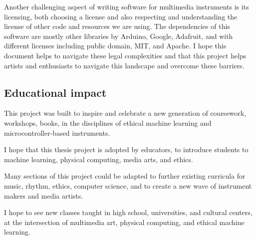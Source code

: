 Another challenging aspect of writing software for multimedia instruments is its licensing, both choosing a license and also respecting and understanding the license of other code and resources we are using. The dependencies of this software are mostly other libraries by Arduino, Google, Adafruit, and with different licenses including public domain, MIT, and Apache. I hope this document helps to navigate these legal complexities and that this project helps artists and enthusiasts to navigate this landscape and overcome these barriers.

\subsection{Educational impact}

This project was built to inspire and celebrate a new generation of coursework, workshops, books, in the disciplines of ethical machine learning and microcontroller-based instruments.

I hope that this thesis project is adopted by educators, to introduce students to machine learning, physical computing, media arts, and ethics.

Many sections of this project could be adapted to further existing curricula for music, rhythm, ethics, computer science, and to create a new wave of instrument makers and media artists.

I hope to see new classes taught in high school, universities, and cultural centers, at the intersection of multimedia art, physical computing, and ethical machine learning.
